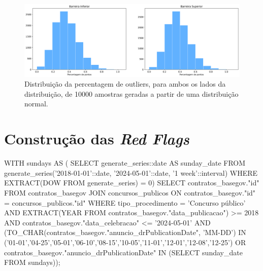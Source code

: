 \begin{figure}[H]
	\centering
	\includegraphics[width=\textwidth]{imagens/stats/histos_barreiras.png}
	\caption{Distribuição da percentagem de outliers, para ambos os lados da distribuição, de 10000 amostras geradas a partir de uma distribuição normal.}
	\label{fig:normalouts}
\end{figure}







\chapter{Construção das \textit{Red Flags}}

\begin{code}[caption={\textit{Query} em PostgreSQL para detetar contratos cuja data de publicação do anúncio em Diário da República seja feito num domingo ou feriado nacional.},captionpos=b, label=lst:rf3code,
	language=SQL,
	showspaces=false,
	basicstyle=\ttfamily,
	numbers=left,
	numberstyle=\tiny,
	commentstyle=\color{gray},	frame=single,
	breaklines=true,
	autogobble = true,
	postbreak=\mbox{\textcolor{red}{$\hookrightarrow$}\space},
	]
	WITH sundays AS (
		SELECT generate_series::date AS sunday_date
		FROM generate_series('2018-01-01'::date, '2024-05-01'::date, '1 week'::interval)
		WHERE EXTRACT(DOW FROM generate_series) = 0)
	SELECT contratos_basegov."id"
	FROM contratos_basegov
	JOIN concursos_publicos ON contratos_basegov."id" = concursos_publicos."id"
	WHERE tipo_procedimento = 'Concurso público' 
		AND EXTRACT(YEAR FROM contratos_basegov."data_publicacao") >= 2018 
		AND contratos_basegov."data_celebracao" <= '2024-05-01'
		AND (TO_CHAR(contratos_basegov."anuncio_drPublicationDate", 'MM-DD') IN 
		('01-01','04-25','05-01','06-10','08-15','10-05','11-01','12-01','12-08','12-25')
		OR contratos_basegov."anuncio_drPublicationDate" IN (SELECT sunday_date FROM sundays));
	
\end{code}


